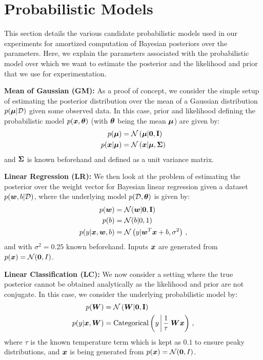 \section{Probabilistic Models}
\label{appdx:probabilistic_models}
This section details the various candidate probabilistic models used in our experiments for amortized computation of Bayesian posteriors over the parameters. Here, we explain the parameters associated with the probabilistic model over which we want to estimate the posterior and the likelihood and prior that we use for experimentation.

\textbf{Mean of Gaussian (GM):} As a proof of concept, we consider the simple setup of estimating the posterior distribution over the mean of a Gaussian distribution $p({\bm{\mu}} | {\mathcal{D}})$ given some observed data. In this case, prior and likelihood defining the probabilistic model $p({\bm{x}}, {\bm{\theta}})$ (with ${\bm{\theta}}$ being the mean ${\bm{\mu}}$) are given by:
\begin{align}
    p({\bm{\mu}}) &= {\mathcal{N}}\left({\bm{\mu}} | \mathbf{0}, \mathbf{I}\right)\\
    p({\bm{x}} | {\bm{\mu}}) &= {\mathcal{N}}\left({\bm{x}} | {\bm{\mu}}, {\bm{\Sigma}}\right) 
\end{align}
and ${\bm{\Sigma}}$ is known beforehand and defined as a unit variance matrix. 









\textbf{Linear Regression (LR):} We then look at the problem of estimating the posterior over the weight vector for Bayesian linear regression given a dataset $p({\bm{w}}, b | {\mathcal{D}})$, where the underlying model $p({\mathcal{D}}, {\bm{\theta}})$ is given by:
\begin{align}
    p({\bm{w}}) &= {\mathcal{N}}({\bm{w}} | \mathbf{0}, \mathbf{I})\\
    p(b) &= {\mathcal{N}}(b | 0, 1)\\
    p(y | {\bm{x}}, {\bm{w}}, b) &= {\mathcal{N}}\left(y | {\bm{w}}^T{\bm{x}} + b, \sigma^2\right) \, ,
\end{align}
and with $\sigma^2 = 0.25$ known beforehand. Inputs ${\bm{x}}$ are generated from $p({\bm{x}}) = {\mathcal{N}}(\mathbf{0}, I)$.


\textbf{Linear Classification (LC):}
We now consider a setting where the true posterior cannot be obtained analytically as the likelihood and prior are not conjugate. In this case, we consider the underlying probabilistic model by:
\begin{align}
    p(\mW) &= \gN\left(\mW | \mathbf{0}, \mathbf{I}\right)\\
    p(y | \vx, \mW) &= \mathrm{Categorical}\left(y  \;\vline\; \frac{1}{\tau}\;\mW\vx\right)\, ,
\end{align}
where $\tau$ is the known temperature term which is kept as $0.1$ to ensure peaky distributions, and ${\bm{x}}$ is being generated from $p({\bm{x}}) = {\mathcal{N}}(\mathbf{0}, I)$.


